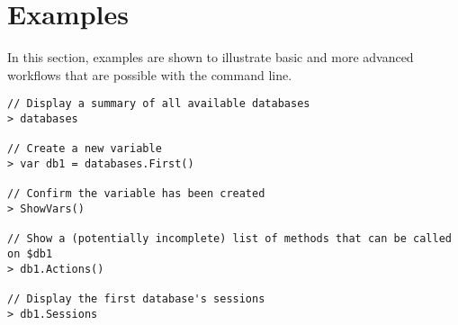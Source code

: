 

\section{Examples}
\label{sec:examples}
In this section, examples are shown to illustrate basic and more advanced workflows that are possible with the command line.
\begin{lstlisting}[title=Basic examples]
// Display a summary of all available databases
> databases

// Create a new variable
> var db1 = databases.First()

// Confirm the variable has been created
> ShowVars()

// Show a (potentially incomplete) list of methods that can be called on $db1
> db1.Actions()

// Display the first database's sessions
> db1.Sessions
\end{lstlisting}

